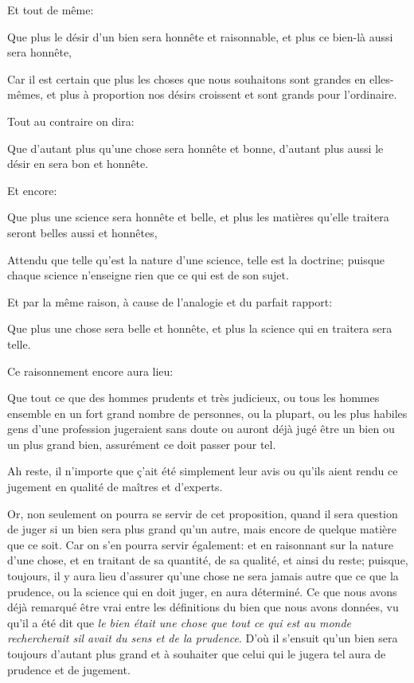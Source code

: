 Et tout de même:

\begin{emphpar}
	Que plus le désir d'un bien sera honnête et raisonnable, et plus ce bien-là aussi sera honnête,
\end{emphpar}

Car il est certain que plus les choses que nous souhaitons sont grandes en elles-mêmes, et plus à proportion nos désirs
croissent et sont grands pour l'ordinaire.

\bigbreak

Tout au contraire on dira:

\begin{emphpar}
	Que d'autant plus qu'une chose sera honnête et bonne, d'autant plus aussi le désir en sera bon et honnête.
\end{emphpar}

Et encore:

\begin{emphpar}
	Que plus une science sera honnête et belle, et plus les matières qu'elle traitera seront belles aussi et honnêtes,
\end{emphpar}

Attendu que telle qu'est la nature d'une science, telle est la doctrine; puisque chaque science n'enseigne rien que ce qui
est de son sujet.

Et par la même raison, à cause de l'analogie et du parfait rapport:

\begin{emphpar}
	Que plus une chose sera belle et honnête, et plus la science qui en traitera sera telle.
\end{emphpar}

\bigbreak

Ce raisonnement encore aura lieu:

\begin{emphpar}
	Que tout ce que des hommes prudents et très judicieux, ou tous les hommes ensemble en un fort grand nombre de personnes,
	ou la plupart, ou les plus habiles gens d'une profession jugeraient sans doute ou auront déjà jugé être un bien ou un plus
	grand bien, assurément ce doit passer pour tel.
\end{emphpar}

Ah reste, il n'importe que ç'ait été simplement leur avis ou qu'ils aient rendu ce jugement en qualité de maîtres et d'experts.

Or, non seulement on pourra se servir de cet proposition, quand il sera question de juger si un bien sera plus grand qu'un autre,
mais encore de quelque matière que ce soit. Car on s'en pourra servir également: et en raisonnant sur la nature d'une chose, et en
traitant de sa quantité, de sa qualité, et ainsi du reste; puisque, toujours, il y aura lieu d’assurer qu'une chose ne sera jamais
autre que ce que la prudence, ou la science qui en doit juger, en aura déterminé. Ce que nous avons déjà remarqué être vrai entre
les définitions du bien que nous avons données, vu qu'il a été dit que \emph{le bien était une chose que tout ce qui est au monde
rechercherait sil avait du sens et de la prudence}. D'où il s'ensuit qu'un bien sera toujours d'autant plus grand et à souhaiter
que celui qui le jugera tel aura de prudence et de jugement.

